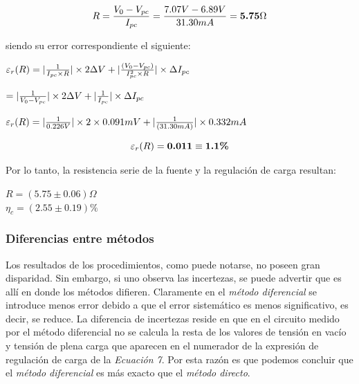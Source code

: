 \documentclass{article}
\begin{document}
\begin{equation}
	R = {V_{0} - V_{pc} \over I_{pc}} = {7.07V - 6.89V \over 31.30mA} = \textbf{5.75$\Omega$} \\
\end{equation}
\bigskip


\noindent siendo su error correspondiente el siguiente:
\bigskip


\begin{center}
	$\varepsilon_r(R) = |{1\over I_{pc} \times R}|\times 2\Delta V + |{(V_{0}-V_{pc})  \over  I_{pc}^2  \times R}| \times \Delta I_{pc} $ \\
\end{center}

\begin{center}
$= |{1\over V_{0} - V_{pc}}|\times 2\Delta V + |{1 \over  I_{pc}}| \times \Delta I_{pc}$\\
\end{center}

\begin{center}
	$\varepsilon_r(R) = |{1\over 0.226V}|\times 2\times 0.091mV+ |{1  \over  (31.30mA)}| \times 0.332mA$ \\
\end{center}


\begin{equation}
	\varepsilon_r(R) = \textbf{0.011} \equiv \textbf{1.1\%} \\
\end{equation}
\bigskip\bigskip


\noindent Por lo tanto, la resistencia serie de la fuente y la regulación de carga resultan:
\medskip

\begin{center}
	$R = (5.75 \pm 0.06)\Omega $ \\ \medskip
	$\eta_c = (2.55 \pm 0.19)\% $ 
\end{center}
\bigskip\bigskip





\subsubsection{Diferencias entre métodos}

	Los resultados de los procedimientos, como puede notarse, no poseen gran disparidad. Sin embargo, si uno observa las incertezas, se puede advertir que es allí en donde los métodos difieren. Claramente en el \textit{método diferencial} se introduce menos error debido a que el error sistemático es menos significativo, es decir, se reduce. La diferencia de incertezas reside en que en el circuito medido por el método diferencial no se calcula la resta de los valores de tensión en vacío y tensión de plena carga que aparecen en el numerador de la expresión de regulación de carga de la \textit{Ecuación 7}. Por esta razón es que podemos concluir que el \textit{método diferencial} es más exacto que el \textit{método directo}.
\bigskip\bigskip\bigskip
\end{document}
